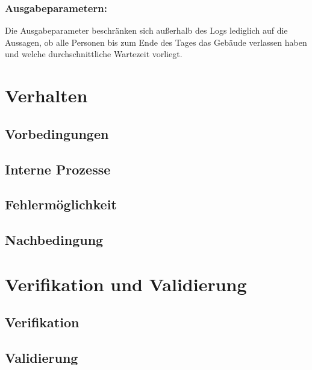 \hypertarget{ausgabeparametern}{%
\subsection{Ausgabeparametern:}\label{ausgabeparametern}}

Die Ausgabeparameter beschränken sich außerhalb des Logs lediglich auf
die Aussagen, ob alle Personen bis zum Ende des Tages das Gebäude
verlassen haben und welche durchschnittliche Wartezeit vorliegt.

\hypertarget{verhalten}{%
\chapter{Verhalten}\label{verhalten}}

\hypertarget{vorbedingungen}{%
\section{Vorbedingungen}\label{vorbedingungen}}

\hypertarget{interne-prozesse}{%
\section{Interne Prozesse}\label{interne-prozesse}}

\hypertarget{fehlermuxf6glichkeit}{%
\section{Fehlermöglichkeit}\label{fehlermuxf6glichkeit}}

\hypertarget{nachbedingung}{%
\section{Nachbedingung}\label{nachbedingung}}

\hypertarget{verifikation-und-validierung}{%
\chapter{Verifikation und
Validierung}\label{verifikation-und-validierung}}

\hypertarget{verifikation}{%
\section{Verifikation}\label{verifikation}}

\hypertarget{validierung}{%
\section{Validierung}\label{validierung}}
